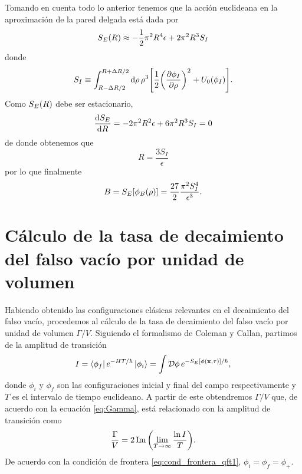 Tomando en cuenta todo lo anterior tenemos que la acción euclideana en la aproximación de la pared delgada está dada por
\begin{equation}
	S_E\qty(R) \approx -\frac{1}{2}\pi^2 R^4 \epsilon + 2\pi^2 R^3 S_I
\end{equation}
donde 
\begin{equation}
	S_I \equiv \int_{R - \Delta R/2}^{R+\Delta R/2} \dd{\rho}  \rho^3 \qty[\frac{1}{2}\qty(\pdv{\phi_I}{\rho})^2 + U_0\qty(\phi_I)].
\end{equation}
Como $S_E\qty(R)$ debe ser estacionario,
\begin{equation}
	\dv{S_E}{R} = -2\pi^2 R^2 \epsilon + 6\pi^2 R^3 S_I = 0
\end{equation}
de donde obtenemos que
\begin{equation}
	R = \frac{3S_I}{\epsilon}
\end{equation}
por lo que finalmente
\begin{equation}
	B = S_E\qty[\phi_B\qty(\rho)] = \frac{27}{2}\frac{\pi^2 S_I^4}{\epsilon^3}.
\end{equation}

\section{Cálculo de la tasa de decaimiento del falso vacío por unidad de volumen}

Habiendo obtenido las configuraciones clásicas relevantes en el decaimiento del falso vacío, procedemos al cálculo de la tasa de decaimiento del falso vacío por unidad de volumen $\Gamma/V$. Siguiendo el formalismo de Coleman y Callan, partimos de la amplitud de transición 
\begin{equation}
I = \bra{\phi_f}e^{-HT/\hbar}\ket{\phi_i} = \int \mathcal{D}\phi \, e^{-S_E\qty[\phi\qty(\vb{x},\tau)]/\hbar},
\end{equation}
donde $\phi_i$ y $\phi_f$ son las configuraciones inicial y final del campo respectivamente y $T$ es el intervalo de tiempo euclideano. A partir de este obtendremos $\Gamma/V$ que, de acuerdo con la ecuación \eqref{eq:Gamma}, está relacionado con la amplitud de transición como
\begin{equation} \label{eq:Gamma/V_amplitud}
\frac{\Gamma}{V} = 2\Im\qty(\lim_{T \rightarrow \infty} \frac{ \ln I}{T}).
\end{equation}
De acuerdo con la condición de frontera \eqref{eq:cond_frontera_qft1}, $\phi_i = \phi_f = \phi_+$. 

